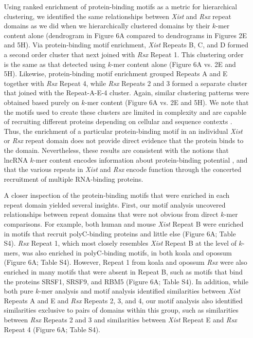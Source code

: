 Using ranked enrichment of protein-binding motifs as a metric for hierarchical clustering, we  identified the same relationships between \emph{Xist} and \emph{Rsx} repeat domains as we did when we hierarchically clustered domains by their $k$-mer content alone (dendrogram in Figure 6A compared to dendrograms in Figures 2E and 5H). Via protein-binding motif enrichment, \emph{Xist} Repeats B, C, and D formed a second order cluster that next joined with \emph{Rsx} Repeat 1.  This clustering order is the same as that detected using $k$-mer content alone (Figure 6A vs. 2E and 5H). Likewise, protein-binding motif enrichment grouped Repeats A and E together with \emph{Rsx} Repeat 4, while \emph{Rsx} Repeats 2 and 3 formed a separate cluster that joined with the Repeat-A-E-4 cluster. Again, similar clustering patterns were obtained based purely on $k$-mer content (Figure 6A vs. 2E and 5H). We note that the motifs used to create these clusters are limited in complexity and are capable of recruiting different proteins depending on cellular and sequence contexts \cite{Dominguez2018SequenceProteins,Ray2013ARegulation}. Thus, the enrichment of a particular protein-binding motif in an individual \emph{Xist} or \emph{Rsx} repeat domain does not provide direct evidence that the protein binds to the domain. Nevertheless, these results are consistent with the notions that lncRNA $k$-mer content encodes information about protein-binding potential \cite{Kirk2018FunctionalContent}, and that the various repeats in \emph{Xist} and \emph{Rsx} encode function through the concerted recruitment of multiple RNA-binding proteins.

A closer inspection of the protein-binding motifs that were enriched in each repeat domain yielded several insights. First, our motif analysis uncovered relationships between repeat domains that were not obvious from direct $k$-mer comparisons. For example, both human and mouse \emph{Xist} Repeat B were enriched in motifs that recruit polyC-binding proteins and little else (Figure 6A; Table S4). \emph{Rsx} Repeat 1, which most closely resembles \emph{Xist} Repeat B at the level of $k$-mers, was also enriched in polyC-binding motifs, in both koala and opossum (Figure 6A; Table S4). However, Repeat 1 from koala and opossum \emph{Rsx} were also enriched in many motifs that were absent in Repeat B, such as motifs that bind the proteins SRSF1, SRSF9, and RBM5 (Figure 6A; Table S4). In addition, while both pure $k$-mer analysis and motif analysis identified similarities between \emph{Xist} Repeats A and E and \emph{Rsx} Repeats 2, 3, and 4, our motif analysis also identified similarities exclusive to pairs of domains within this group, such as similarities between \emph{Rsx} Repeats 2 and 3 and similarities between \emph{Xist} Repeat E and \emph{Rsx} Repeat 4 (Figure 6A; Table S4). 

